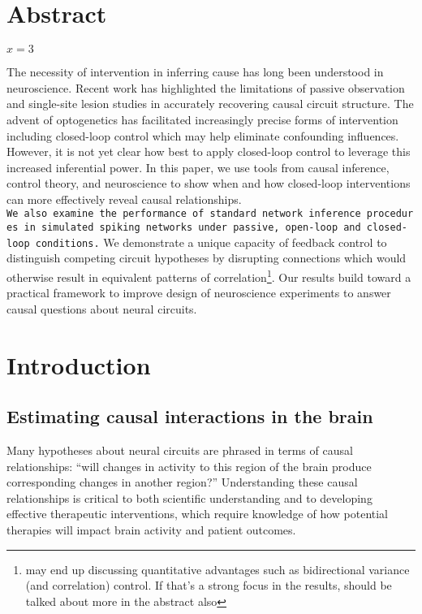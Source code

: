 \hypertarget{abstract}{%
\section{Abstract}\label{abstract}}

\(x = 3\)

The necessity of intervention in inferring cause has long been
understood in neuroscience. Recent work has highlighted the limitations
of passive observation and single-site lesion studies in accurately
recovering causal circuit structure. The advent of optogenetics has
facilitated increasingly precise forms of intervention including
closed-loop control which may help eliminate confounding influences.
However, it is not yet clear how best to apply closed-loop control to
leverage this increased inferential power. In this paper, we use tools
from causal inference, control theory, and neuroscience to show when and
how closed-loop interventions can more effectively reveal causal
relationships.
\texttt{We\ also\ examine\ the\ performance\ of\ standard\ network\ inference\ procedures\ in\ simulated\ spiking\ networks\ under\ passive,\ open-loop\ and\ closed-loop\ conditions.}
We demonstrate a unique capacity of feedback control to distinguish
competing circuit hypotheses by disrupting connections which would
otherwise result in equivalent patterns of correlation\footnote{may end
  up discussing quantitative advantages such as bidirectional variance
  (and correlation) control. If that's a strong focus in the results,
  should be talked about more in the abstract also}. Our results build
toward a practical framework to improve design of neuroscience
experiments to answer causal questions about neural circuits.

\hypertarget{introduction}{%
\section{Introduction}\label{introduction}}

\hypertarget{estimating-causal-interactions-in-the-brain}{%
\subsection{Estimating causal interactions in the
brain}\label{estimating-causal-interactions-in-the-brain}}

Many hypotheses about neural circuits are phrased in terms of causal
relationships: ``will changes in activity to this region of the brain
produce corresponding changes in another region?'' Understanding these
causal relationships is critical to both scientific understanding and to
developing effective therapeutic interventions, which require knowledge
of how potential therapies will impact brain activity and patient
outcomes.

